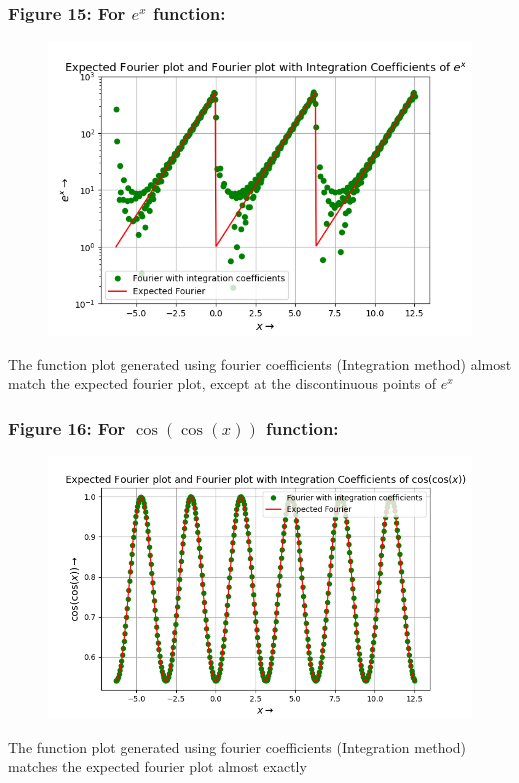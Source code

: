 \documentclass[12pt, a4paper]{article}
\begin{document}
\subsubsection{Figure 15: For $e^{x}$ function:}
\vspace*{-0.5cm}
\begin{figure}[H]
        \centering
        \includegraphics[scale = 0.7]{Figure_15.png}
        \label{fig:sample}
    \end{figure}
\vspace*{-0.5cm}
    \begin{center}
        The function plot generated using fourier coefficients (Integration method) almost match the expected fourier plot, except at the discontinuous points of $e^{x}$ 
    \end{center}
\subsubsection{Figure 16: For $\cos(\cos(x))$ function:}
\vspace*{-0.5cm}
\begin{figure}[H]
    \centering
    \includegraphics[scale = 0.7]{Figure_16.png}
    \label{fig:sample}
\end{figure}
\vspace*{-0.5cm}
\begin{center}
    The function plot generated using fourier coefficients (Integration method) matches the expected fourier plot almost exactly  
\end{center}
\end{document}
